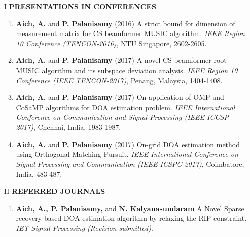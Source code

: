 \documentclass[12pt,a4paper]{article}
\theoremstyle{plain}
\theoremstyle{definition}
\begin{document}
\begin{itemize}

\item[I] \textbf{PRESENTATIONS IN CONFERENCES}

\begin{enumerate}[ 1. ]
\item \textbf{Aich, A.} and \textbf{P. Palanisamy} (2016) A strict bound for dimension of measurement matrix for CS beamformer MUSIC algorithm. \emph{IEEE Region 10 Conference (TENCON-2016)}, NTU Singapore, 2602-2605.

\item \textbf{Aich, A.} and \textbf{P. Palanisamy} (2017) A novel CS beamformer root-MUSIC algorithm and its subspace deviation analysis. \emph{IEEE Region 10 Conference (IEEE TENCON-2017)}, Penang, Malaysia, 1404-1408.

\item \textbf{Aich, A.} and \textbf{P. Palanisamy} (2017) On application of OMP and CoSaMP algorithms for DOA estimation problem. \emph{IEEE International Conference on Communication and Signal Processing (IEEE ICCSP-2017)}, Chennai, India, 1983-1987.

\item \textbf{Aich, A.} and \textbf{P. Palanisamy} (2017) On-grid DOA estimation method using Orthogonal Matching Pursuit. \emph{IEEE International Conference on Signal Processing and Communication (IEEE ICSPC-2017)}, Coimbatore, India, 483-487.
\end{enumerate}

\item[II] \textbf{REFERRED JOURNALS}
\begin{enumerate}[ 1. ]
\item \textbf{Aich, A., P. Palanisamy,} and \textbf{N. Kalyanasundaram} A Novel Sparse recovery based DOA estimation algorithm by relaxing the RIP constraint. \emph{IET-Signal Processing (Revision submitted)}.

\end{enumerate}
\end{itemize}

 
\end{document}
